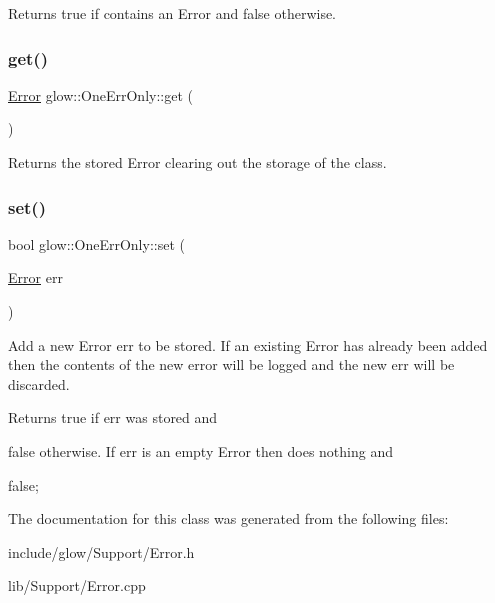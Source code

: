 \begin{DoxyReturn}{Returns}
true if contains an Error and false otherwise. 
\end{DoxyReturn}
\mbox{\label{classglow_1_1_one_err_only_aaa1698514bac6aae1a6f1396e1310713}} 
\subsubsection{\texorpdfstring{get()}{get()}}
{\footnotesize\ttfamily \hyperlink{namespaceglow_afdb176c3a672ef66db0ecfc19a8d39bf}{Error} glow\+::\+One\+Err\+Only\+::get (\begin{DoxyParamCaption}{ }\end{DoxyParamCaption})}

\begin{DoxyReturn}{Returns}
the stored Error clearing out the storage of the class. 
\end{DoxyReturn}
\mbox{\label{classglow_1_1_one_err_only_a09102f1c51e1431e53b52150e57df247}} 
\subsubsection{\texorpdfstring{set()}{set()}}
{\footnotesize\ttfamily bool glow\+::\+One\+Err\+Only\+::set (\begin{DoxyParamCaption}\item[{\hyperlink{namespaceglow_afdb176c3a672ef66db0ecfc19a8d39bf}{Error}}]{err }\end{DoxyParamCaption})}

Add a new Error {\ttfamily err} to be stored. If an existing Error has already been added then the contents of the new error will be logged and the new err will be discarded. \begin{DoxyReturn}{Returns}
true if {\ttfamily err} was stored and 

false otherwise. If {\ttfamily err} is an empty Error then does nothing and 

false; 
\end{DoxyReturn}


The documentation for this class was generated from the following files\+:\begin{DoxyCompactItemize}
\item 
include/glow/\+Support/Error.\+h\item 
lib/\+Support/Error.\+cpp\end{DoxyCompactItemize}
